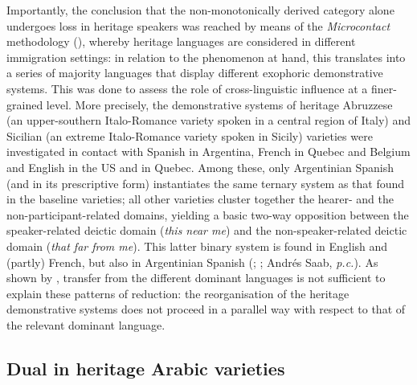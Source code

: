 \documentclass[output=paper]{langscibook}
\begin{document}
\noindent Importantly, the conclusion that the non-monotonically derived category alone undergoes loss in heritage speakers was reached by means of the \textit{Microcontact} methodology (\citealt{DAlessandro2021, AndrianiEtAl2022b}), whereby heritage languages are considered in different immigration settings: in relation to the phenomenon at hand, this translates into a series of majority languages that display different exophoric demonstrative systems. This was done to assess the role of cross-linguistic influence at a finer-grained level. More precisely, the demonstrative systems of heritage Abruzzese (an upper-southern Italo-Romance variety spoken in a central region of Italy) and Sicilian (an extreme Italo-Romance variety spoken in Sicily) varieties were investigated in contact with Spanish in Argentina, French in Quebec and Belgium and English in the US and in Quebec. Among these, only Argentinian Spanish (and in its prescriptive form) instantiates the same ternary system as that found in the baseline varieties; all other varieties cluster together the hearer- and the non-participant-related domains, yielding a basic two-way opposition between the speaker-related deictic domain (\textit{this near me}) and the non-speaker-related deictic domain (\textit{that far from me}). This latter binary system is found in English and (partly) French, but also in Argentinian Spanish (\citealt[135]{Kany1945}; \citealt[888]{LS16}; Andrés Saab, \textit{p.c.}). As shown by \citet{Terenghi2022Ls}, transfer from the different dominant languages is not sufficient to explain these patterns of reduction: the reorganisation of the heritage demonstrative systems does not proceed in a parallel way with respect to that of the relevant dominant language. 


\subsection{Dual in heritage Arabic varieties\label{sec:dual}}
\end{document}
